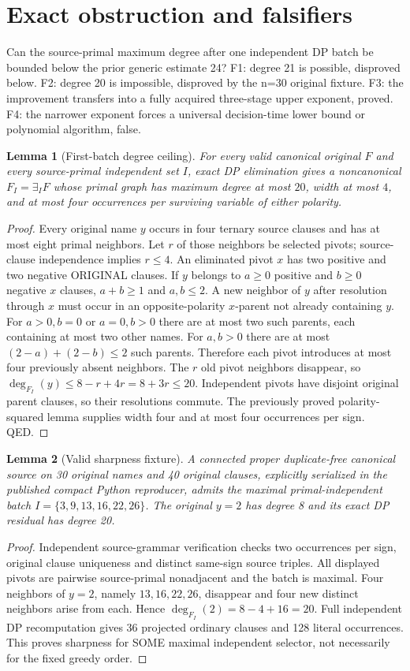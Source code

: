 \documentclass[11pt]{article}
\newtheorem{lemma}{Lemma}
\begin{document}
\section{Exact obstruction and falsifiers}
Can the source-primal maximum degree after one independent DP batch be bounded below the prior generic estimate 24? F1: degree 21 is possible, disproved below. F2: degree 20 is impossible, disproved by the n=30 original fixture. F3: the improvement transfers into a fully acquired three-stage upper exponent, proved. F4: the narrower exponent forces a universal decision-time lower bound or polynomial algorithm, false.
\begin{lemma}[First-batch degree ceiling]
For every valid canonical original $F$ and every source-primal independent set $I$, exact DP elimination gives a noncanonical $F_I=\exists_I F$ whose primal graph has maximum degree at most $20$, width at most $4$, and at most four occurrences per surviving variable of either polarity.
\end{lemma}
\begin{proof}
Every original name $y$ occurs in four ternary source clauses and has at most eight primal neighbors. Let $r$ of those neighbors be selected pivots; source-clause independence implies $r\le4$. An eliminated pivot $x$ has two positive and two negative ORIGINAL clauses. If $y$ belongs to $a\ge0$ positive and $b\ge0$ negative $x$ clauses, $a+b\ge1$ and $a,b\le2$. A new neighbor of $y$ after resolution through $x$ must occur in an opposite-polarity $x$-parent not already containing $y$. For $a>0,b=0$ or $a=0,b>0$ there are at most two such parents, each containing at most two other names. For $a,b>0$ there are at most $(2-a)+(2-b)\le2$ such parents. Therefore each pivot introduces at most four previously absent neighbors. The $r$ old pivot neighbors disappear, so $\deg_{F_I}(y)\le8-r+4r=8+3r\le20$. Independent pivots have disjoint original parent clauses, so their resolutions commute. The previously proved polarity-squared lemma supplies width four and at most four occurrences per sign. QED.
\end{proof}
\begin{lemma}[Valid sharpness fixture]
A connected proper duplicate-free canonical source on 30 original names and 40 original clauses, explicitly serialized in the published compact Python reproducer, admits the maximal primal-independent batch $I=\{3,9,13,16,22,26\}$. The original $y=2$ has degree 8 and its exact DP residual has degree 20.
\end{lemma}
\begin{proof}
Independent source-grammar verification checks two occurrences per sign, original clause uniqueness and distinct same-sign source triples. All displayed pivots are pairwise source-primal nonadjacent and the batch is maximal. Four neighbors of $y=2$, namely $13,16,22,26$, disappear and four new distinct neighbors arise from each. Hence $\deg_{F_I}(2)=8-4+16=20$. Full independent DP recomputation gives 36 projected ordinary clauses and 128 literal occurrences. This proves sharpness for SOME maximal independent selector, not necessarily for the fixed greedy order.
\end{proof}
\end{document}
